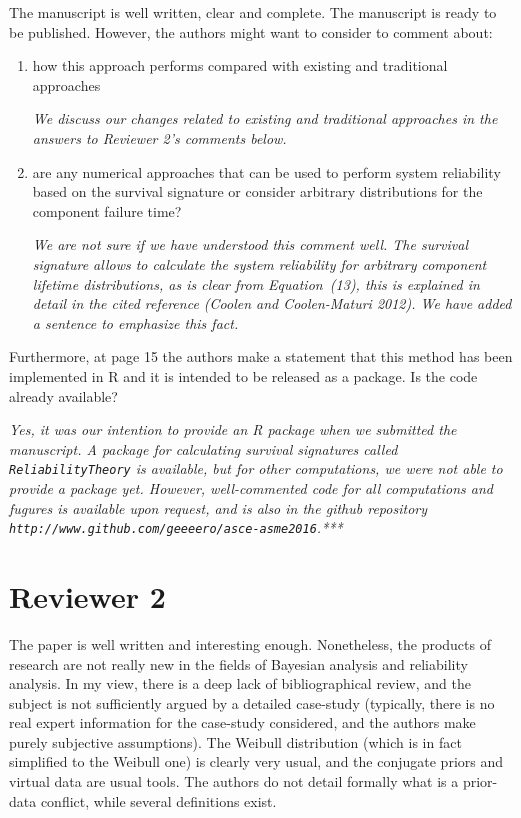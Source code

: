 \documentclass[Journal,SectionNumbers,SingleSpace,InsideFigs]{ascelike}
\begin{document}
The manuscript is well written, clear and complete. The manuscript is ready to be published.
However, the authors might want to consider to comment about:
\begin{enumerate}
\item how this approach performs compared with existing and traditional approaches

\smallskip

\emph{We discuss our changes related to existing and traditional approaches in the answers to Reviewer 2's comments below.}

\item are any numerical approaches that can be used to perform system reliability based on the survival signature
or consider arbitrary distributions for the component failure time?

\smallskip

\emph{We are not sure if we have understood this comment well.
The survival signature allows to calculate the system reliability for arbitrary component lifetime distributions,
as is clear from Equation~(13), this is explained in detail in the cited reference (Coolen and Coolen-Maturi 2012).
We have added a sentence to emphasize this fact.}
\end{enumerate}

Furthermore, at page 15 the authors make a statement that this method has been implemented in R
and it is intended to be released as a package. Is the code already available? 

\smallskip

\emph{Yes, it was our intention to provide an \textsf{R} package when we submitted the manuscript.
A package for calculating survival signatures called \texttt{ReliabilityTheory} is available,
but for other computations, we were not able to provide a package yet. %
However, well-commented code for all computations and fugures is available upon request,
and is also in the github repository
\texttt{http://www.github.com/geeeero/asce-asme2016}.***}


\section*{Reviewer 2}

The paper is well written and interesting enough.
Nonetheless, the products of research are not really new in the fields of Bayesian analysis and reliability analysis.
In my view, there is a deep lack of bibliographical review,
and the subject is not sufficiently argued by a detailed case-study
(typically, there is no real expert information for the case-study considered, and the authors make purely subjective assumptions).
The Weibull distribution (which is in fact simplified to the Weibull one) is clearly very usual,
and the conjugate priors and virtual data are usual tools.
The authors do not detail formally what is a prior-data conflict, while several definitions exist.
\end{document}
